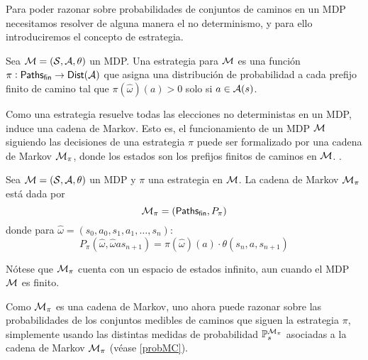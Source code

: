 Para poder razonar sobre probabilidades de conjuntos de caminos en un MDP
necesitamos resolver de alguna manera el no determinismo, y para ello
introduciremos el concepto de estrategia.

\begin{definition}
	Sea $\mathcal{M} = (\mathcal{S}, \mathcal{A}, \theta)$ un MDP. Una estrategia para $\mathcal{M}$ es una función $\pi: \textsf{Paths}_\textsf{fin} \rightarrow \mathsf{Dist} (\mathcal{A})$ que asigna una distribución de probabilidad a cada prefijo finito de camino tal que $\pi(\hat \omega) (a) > 0$ solo si $a \in \mathcal{A}(s)$.
\end{definition}


Como una estrategia resuelve todas las elecciones no deterministas en un MDP,
induce una cadena de Markov. Esto es, el funcionamiento de un MDP $\mathcal{M}$
siguiendo las decisiones de una estrategia $\pi$ puede ser formalizado por una
cadena de Markov $\mathcal{M}_\pi$, donde los estados son los prefijos finitos de
caminos en $\mathcal{M}$. .

\begin{definition}
	Sea $\mathcal{M} = (\mathcal{S}, \mathcal{A}, \theta)$ un MDP y $\pi$ una estrategia en $\mathcal{M}$. La cadena de Markov $\mathcal{M}_\pi$ está dada por
	$$\mathcal{M}_\pi = (\textsf{Paths}_\textsf{fin}, P_\pi)$$
	donde para $\hat \omega = (s_0, a_0, s_1, a_1, \dots, s_n)$:
	$$P_\pi(\hat \omega, \hat \omega a s_{n+1}) = \pi(\hat \omega)(a) \cdot \theta(s_n, a, s_{n+1})$$
\end{definition}

Nótese que $\mathcal{M}_\pi$ cuenta con un espacio de estados infinito, aun cuando el
MDP $\mathcal{M}$ es finito.

Como $\mathcal{M}_\pi$ es una cadena de Markov, uno ahora puede razonar sobre las
probabilidades de los conjuntos medibles de caminos que siguen la estrategia
$\pi$, simplemente usando las distintas medidas de probabilidad
$\mathbb{P}^{\mathcal{M}_\pi}_s$ asociadas a la cadena de Markov $\mathcal{M}_\pi$ (véase
\ref{probMC}).


